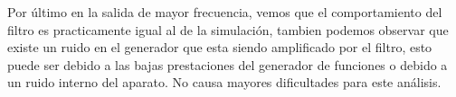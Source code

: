 Por \'ultimo en la salida de mayor frecuencia, vemos que el comportamiento del filtro es practicamente igual al de la simulaci\'on, tambien podemos  observar que existe un ruido en el generador que esta siendo amplificado por el filtro, esto puede ser debido a las bajas prestaciones del generador de funciones o debido a un ruido interno del aparato. No causa mayores dificultades para este an\'alisis.
